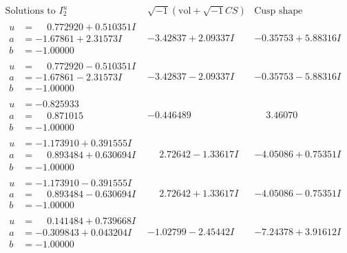 \documentclass[1p]{elsarticle_modified}
\theoremstyle{definition}
\newcommand{\I}{\sqrt{-1}}
\begin{document}
$$\begin{array}{c|c|c}  
\text{Solutions to }I^u_{2}& \I (\text{vol} + \sqrt{-1}CS) & \text{Cusp shape}\\
 \hline 
\begin{aligned}
u &= \phantom{-}0.772920 + 0.510351 I \\
a &= -1.67861 + 2.31573 I \\
b &= -1.00000\phantom{ +0.000000I}\end{aligned}
 & -3.42837 + 2.09337 I & -0.35753 + 5.88316 I \\ \hline\begin{aligned}
u &= \phantom{-}0.772920 - 0.510351 I \\
a &= -1.67861 - 2.31573 I \\
b &= -1.00000\phantom{ +0.000000I}\end{aligned}
 & -3.42837 - 2.09337 I & -0.35753 - 5.88316 I \\ \hline\begin{aligned}
u &= -0.825933\phantom{ +0.000000I} \\
a &= \phantom{-}0.871015\phantom{ +0.000000I} \\
b &= -1.00000\phantom{ +0.000000I}\end{aligned}
 & -0.446489\phantom{ +0.000000I} & \phantom{-}3.46070\phantom{ +0.000000I} \\ \hline\begin{aligned}
u &= -1.173910 + 0.391555 I \\
a &= \phantom{-}0.893484 + 0.630694 I \\
b &= -1.00000\phantom{ +0.000000I}\end{aligned}
 & \phantom{-}2.72642 - 1.33617 I & -4.05086 + 0.75351 I \\ \hline\begin{aligned}
u &= -1.173910 - 0.391555 I \\
a &= \phantom{-}0.893484 - 0.630694 I \\
b &= -1.00000\phantom{ +0.000000I}\end{aligned}
 & \phantom{-}2.72642 + 1.33617 I & -4.05086 - 0.75351 I \\ \hline\begin{aligned}
u &= \phantom{-}0.141484 + 0.739668 I \\
a &= -0.309843 + 0.043204 I \\
b &= -1.00000\phantom{ +0.000000I}\end{aligned}
 & -1.02799 - 2.45442 I & -7.24378 + 3.91612 I \\ \hline\begin{aligned}

\end{aligned}
\end{array}$$
\end{document}
